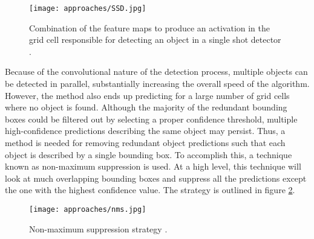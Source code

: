 \begin{figure}[h]
	\caption{Combination of the feature maps to produce an activation in the grid cell responsible for detecting an object in a single shot detector \cite{Jordan2018}.}
	\centering
	\texttt{[image: approaches/SSD.jpg]}
	\label{fig:ssd}
\end{figure}

Because of the convolutional nature of the detection process, multiple objects can be detected in parallel, substantially increasing the overall speed of the algorithm. However, the method also ends up predicting for a large number of grid cells where no object is found. Although the majority of the redundant bounding boxes could be filtered out by selecting a proper confidence threshold, multiple high-confidence predictions describing the same object may persist. Thus, a method is needed for removing redundant object predictions such that each object is described by a single bounding box. To accomplish this, a technique known as non-maximum suppression is used. At a high level, this technique will look at much overlapping bounding boxes and suppress all the predictions except the one with the highest confidence value. The strategy is outlined in figure \ref{fig:nms}.

\begin{figure}[h]
	\caption{Non-maximum suppression strategy \cite{Jordan2018}.}
	\centering
	\texttt{[image: approaches/nms.jpg]}
	\label{fig:nms}
\end{figure}

